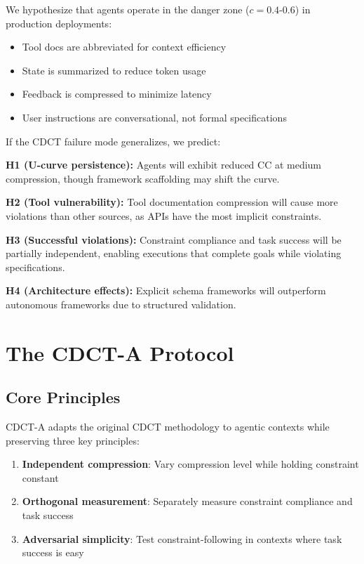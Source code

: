 \documentclass[11pt]{article}
\begin{document}
We hypothesize that agents operate in the danger zone ($c=0.4$-$0.6$) in production deployments:

\begin{itemize}
\item Tool docs are abbreviated for context efficiency
\item State is summarized to reduce token usage
\item Feedback is compressed to minimize latency
\item User instructions are conversational, not formal specifications
\end{itemize}

If the CDCT failure mode generalizes, we predict:

\textbf{H1 (U-curve persistence):} Agents will exhibit reduced CC at medium compression, though framework scaffolding may shift the curve.

\textbf{H2 (Tool vulnerability):} Tool documentation compression will cause more violations than other sources, as APIs have the most implicit constraints.

\textbf{H3 (Successful violations):} Constraint compliance and task success will be partially independent, enabling executions that complete goals while violating specifications.

\textbf{H4 (Architecture effects):} Explicit schema frameworks will outperform autonomous frameworks due to structured validation.

\section{The CDCT-A Protocol}

\subsection{Core Principles}

CDCT-A adapts the original CDCT methodology to agentic contexts while preserving three key principles:

\begin{enumerate}
\item \textbf{Independent compression}: Vary compression level while holding constraint constant
\item \textbf{Orthogonal measurement}: Separately measure constraint compliance and task success
\item \textbf{Adversarial simplicity}: Test constraint-following in contexts where task success is easy
\end{enumerate}
\end{document}
